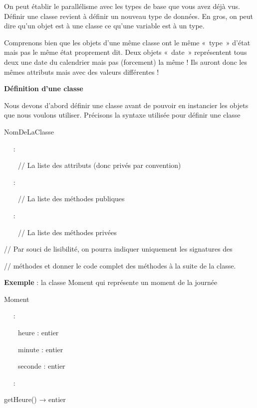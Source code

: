 {
On peut établir le parallélisme avec les types de base que vous avez
déjà vus. Définir une classe revient à définir un nouveau type de
données. En gros, on peut dire qu'un\textbf{ }objet
est à une classe ce qu'une variable est à un type.}

{
Comprenons bien que les objets d'une même classe ont le
même «~type~» d'état mais pas le même état proprement
dit. Deux objets «~date~» représentent tous deux une date du calendrier
mais pas (forcement) la même ! Ils auront donc les mêmes attributs mais
avec des valeurs différentes !}

{\sffamily\bfseries\upshape
Définition d'une classe}

{
Nous devons d'abord définir une classe avant de pouvoir
en instancier les objets que nous voulons utiliser. Précisons la
syntaxe utilisée pour définir une classe}

{\sffamily
{} NomDeLaClasse}

{\sffamily
\ \  :\ \ \ \ }

{\sffamily
\ \ \ \ // La liste des attributs (donc privés par convention)}

{\sffamily
\ \  :\ \ \ \ }

{\sffamily
\ \ \ \ // La liste des méthodes publiques}

{\sffamily
\ \  :\ \ \ \ }

{\sffamily
\ \ \ \ // La liste des méthodes privées}

{\sffamily
{}\textbf{ }}

{\sffamily
// Par souci de lisibilité, on pourra indiquer uniquement les signatures
des}

{\sffamily
// méthodes et donner le code complet des méthodes à la suite de la
classe.}

{
\textbf{Exemple} : la classe Moment qui représente un moment de la
journée}

{\sffamily
{} Moment}

{\sffamily
\ \  :\ \ \ \ }

{\sffamily
\ \ \ \ heure : entier}

{\sffamily
\ \ \ \ minute : entier}

{\sffamily
\ \ \ \ seconde : entier}

{\sffamily
\ \  :\ \ \ \ }

{\sffamily
{} getHeure() → entier}

